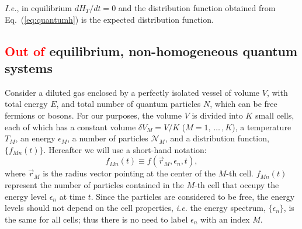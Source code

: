 \textit{I.e.}, in equilibrium $dH_T/dt=0$ and the distribution function obtained from
Eq.~(\ref{eq:quantumh}) is the expected distribution function.

\begin{comment}
In addition, Tolman also showed that (\ref{eq:quantumh}) can be reduced, in the
high-energy limit, to
%
\begin{equation}
    H_T = \sum_{\kappa} (n_{\kappa} \ln n_{\kappa} - n_{\kappa} \ln g_{\kappa}). \label{reduce-h}
\end{equation}
%
This expression also can be obtained also from the Boltzmann $H$-functional through defining
%
\begin{equation}
    f=\frac{n_{\kappa}}{ g_{\kappa}}.
\end{equation}
\end{comment}
%



\subsection{\textcolor{red}{Out of} equilibrium, non-homogeneous quantum systems}

Consider a diluted gas enclosed by a perfectly isolated vessel of volume $V$, with
total energy $E$, and total number of quantum particles $N$, which can be free fermions or
bosons. For our purposes, the volume $V$ is divided into $K$ small cells, each of which
has a constant volume $\delta V_M=V/K$ ($M=1,\,\dots\,,K$), a temperature $T_M$, an energy $\epsilon_M$,
a number of particles $\mathcal{N}_M$, and a distribution function,
$\{f_{Mn}(t)\}$. Hereafter we will use a short-hand notation:
%
\begin{equation}
   f_{Mn}(t)\equiv f(\vec r_M,\epsilon_{n},t),
\end{equation}
%
where $\vec r_M$ is the radius vector pointing at the center of the $M$-th cell.
$f_{Mn}(t)$ represent the number
of particles contained in the $M$-th cell that occupy the energy level $\epsilon_n$ at
time $t$. Since the particles are considered to be free, the energy levels should not
depend on the cell properties, \textit{i.e.} the energy spectrum, $\{\epsilon_n\}$, is the same for all
cells; thus there is no need to label $\epsilon_n$ with an index $M$.

